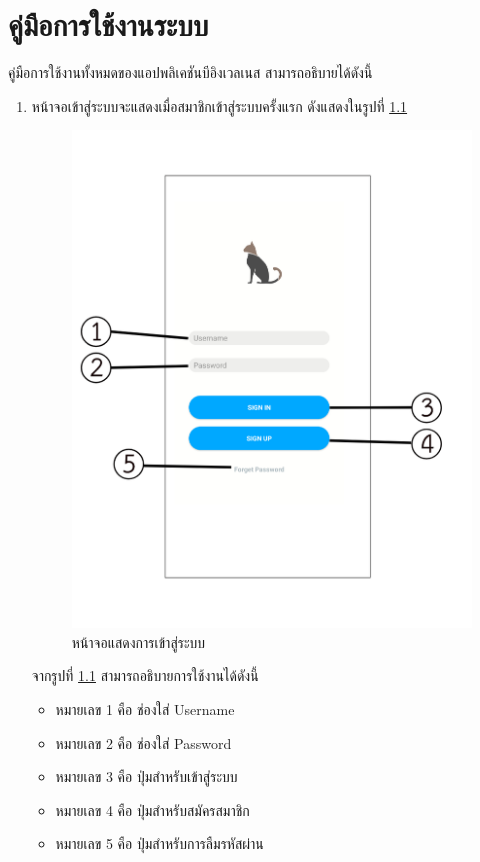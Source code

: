 \chapter{คู่มือการใช้งานระบบ}
คู่มือการใช้งานทั้งหมดของแอปพลิเคชันบีอิงเวลเนส สามารถอธิบายได้ดังนี้ 

	\begin{enumerate}
			\item  หน้าจอเข้าสู่ระบบจะแสดงเมื่อสมาชิกเข้าสู่ระบบครั้งแรก ดังแสดงในรูปที่ \ref{Fig:login}
			\begin{figure}[H]
				\centering
				\includegraphics[width=0.5\columnwidth]{Figures/7/teach/1.png}
				\caption{หน้าจอแสดงการเข้าสู่ระบบ}
				\label{Fig:login}
			\end{figure}
		จากรูปที่ \ref{Fig:login} สามารถอธิบายการใช้งานได้ดังนี้
			\begin{itemize}[label={--}]
				\item หมายเลข 1 คือ ช่องใส่ Username
				\item หมายเลข 2 คือ ช่องใส่ Password
				\item หมายเลข 3 คือ ปุ่มสำหรับเข้าสู่ระบบ
				\item หมายเลข 4 คือ ปุ่มสำหรับสมัครสมาชิก
				\item หมายเลข 5 คือ ปุ่มสำหรับการลืมรหัสผ่าน
			\end{itemize}
		
		


\end{enumerate}
